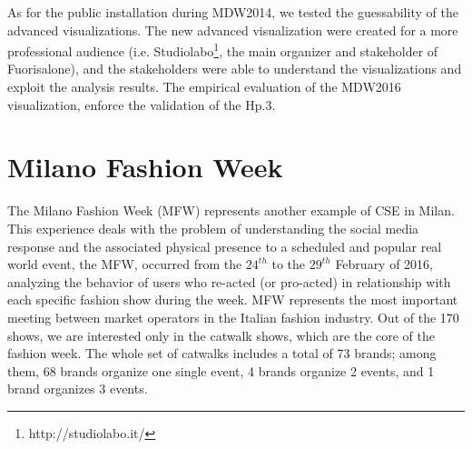 As for the public installation during MDW2014, we tested the guessability of the advanced visualizations.
The new advanced visualization were created for a more professional audience (i.e. Studiolabo\footnote{http://studiolabo.it/}, the main organizer and stakeholder of Fuorisalone), and the stakeholders were able to understand the visualizations and exploit the analysis results.
The empirical evaluation of the MDW2016 visualization, enforce the validation of the \textsf{Hp.3}.

{\color{red}

\section{Milano Fashion Week} \label{sec:cs-mfw}
The Milano Fashion Week (MFW) represents another example of CSE in Milan. This experience deals with the problem of understanding the social media response and the associated physical presence to a scheduled and popular real world event, the MFW, occurred from the $24^{th}$ to the $29^{th}$ February of 2016, analyzing the behavior of users who re-acted (or pro-acted) in relationship with each specific fashion show during the week. MFW represents the most important meeting between market operators in the Italian fashion industry. Out of the 170 shows, we are interested only in the catwalk shows, which are the core of the fashion week. The whole set of catwalks includes a total of 73 brands; among them, 68 brands organize one single event, 4 brands organize 2 events, and 1 brand organizes 3 events. 

}
